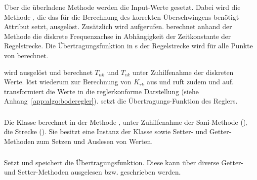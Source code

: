\"Uber  die  \"uberladene  Methode    werden  die  Input-Werte
gesetzt. Dabei wird die Methode , die das f\"ur die
Berechnung  des  korrekten  \"Uberschwingens ben\"otigt  Attribut  
setzt,    ausgel\"ost. Zus\"atzlich   wird       aufgerufen.
  berechnet  anhand   der  Methode  
die   diskrete  Frequenzachse   in   Abh\"angigkeit   der  Zeitkonstante   der
Regelstrecke. Die \"Ubertragungsfunktion in s der Regelstrecke wird f\"ur alle
Punkte von  berechnet.

  wird ausgel\"ost  und berechnet  $T_{nk}$ und  $T_{vk}$
unter   Zuhilfenahme  der   diskreten   Werte.     l\"ost
wiederum     zur   Berechnung   von   $K_{rk}$  aus   und
ruft   zudem      und      auf.
 transformiert die Werte in die reglerkonforme
Darstellung  (siehe  Anhang~\ref{app:algo:boderegler}).   setzt
die \"Ubertragungs-Funktion des Reglers.


\subsubsection*{}
Die   Klasse     berechnet  in   der  Methode   ,
unter   Zuhilfenahme  der   Sani-Methode  (),   die  Strecke
(). Sie besitzt  eine Instanz  der Klasse   sowie Setter-
und Getter-Methoden zum Setzen und Auslesen von Werten.


\subsubsection*{}
Setzt  und speichert  die  \"Ubertragungsfunktion. Diese  kann \"uber  diverse
Getter- und Setter-Methoden ausgelesen bzw. geschrieben werden.
